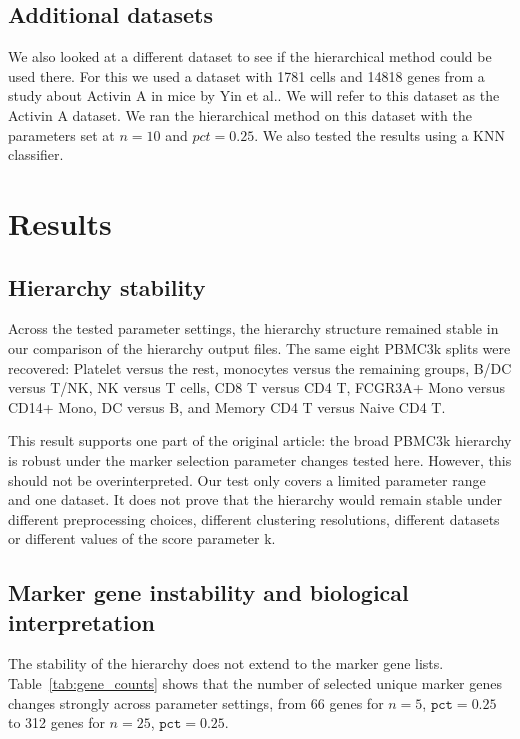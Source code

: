 \documentclass[11pt,a4paper]{article}
\begin{document}
\subsection{Additional datasets}

We also looked at a different dataset to see if the hierarchical method could be used there.
For this we used a dataset with 1781 cells and 14818 genes from a study about Activin A in mice by Yin et al.\cite{yin2026}.
We will refer to this dataset as the Activin A dataset.
We ran the hierarchical method on this dataset with the parameters set at $n=10$ and $pct=0.25$.
We also tested the results using a KNN classifier.

\section{Results}

\subsection{Hierarchy stability}

Across the tested parameter settings, the hierarchy structure remained stable in our comparison of the hierarchy output files.
The same eight PBMC3k splits were recovered: Platelet versus the rest, monocytes versus the remaining groups, B/DC versus T/NK, NK versus T cells, CD8 T versus CD4 T, FCGR3A+ Mono versus CD14+ Mono, DC versus B, and Memory CD4 T versus Naive CD4 T.

This result supports one part of the original article: the broad PBMC3k hierarchy is robust under the marker selection parameter changes tested here.
However, this should not be overinterpreted.
Our test only covers a limited parameter range and one dataset.
It does not prove that the hierarchy would remain stable under different preprocessing choices, different clustering resolutions, different datasets or different values of the score parameter k.

\subsection{Marker gene instability and biological interpretation}

The stability of the hierarchy does not extend to the marker gene lists.
Table~\ref{tab:gene_counts} shows that the number of selected unique marker genes changes strongly across parameter settings, from 66 genes for $n=5$, $\texttt{pct}=0.25$ to 312 genes for $n=25$, $\texttt{pct}=0.25$.
\end{document}
